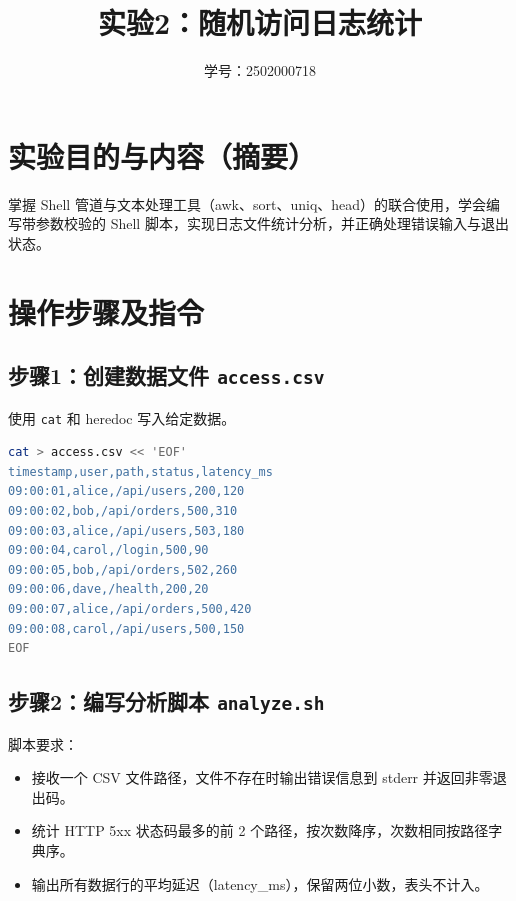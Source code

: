 \documentclass{article}
\title{实验2：随机访问日志统计}
\author{学号：2502000718}
\date{}
\begin{document}
\maketitle

\section{实验目的与内容（摘要）}
掌握 Shell 管道与文本处理工具（awk、sort、uniq、head）的联合使用，学会编写带参数校验的 Shell 脚本，实现日志文件统计分析，并正确处理错误输入与退出状态。

\section{操作步骤及指令}

\subsection{步骤1：创建数据文件 \texttt{access.csv}}
使用 \texttt{cat} 和 heredoc 写入给定数据。
\begin{lstlisting}[language=bash, basicstyle=\ttfamily\small]
cat > access.csv << 'EOF'
timestamp,user,path,status,latency_ms
09:00:01,alice,/api/users,200,120
09:00:02,bob,/api/orders,500,310
09:00:03,alice,/api/users,503,180
09:00:04,carol,/login,500,90
09:00:05,bob,/api/orders,502,260
09:00:06,dave,/health,200,20
09:00:07,alice,/api/orders,500,420
09:00:08,carol,/api/users,500,150
EOF
\end{lstlisting}

\subsection{步骤2：编写分析脚本 \texttt{analyze.sh}}
脚本要求：
\begin{itemize}
    \item 接收一个 CSV 文件路径，文件不存在时输出错误信息到 stderr 并返回非零退出码。
    \item 统计 HTTP 5xx 状态码最多的前 2 个路径，按次数降序，次数相同按路径字典序。
    \item 输出所有数据行的平均延迟（latency\_ms），保留两位小数，表头不计入。
\end{itemize}
\end{document}
